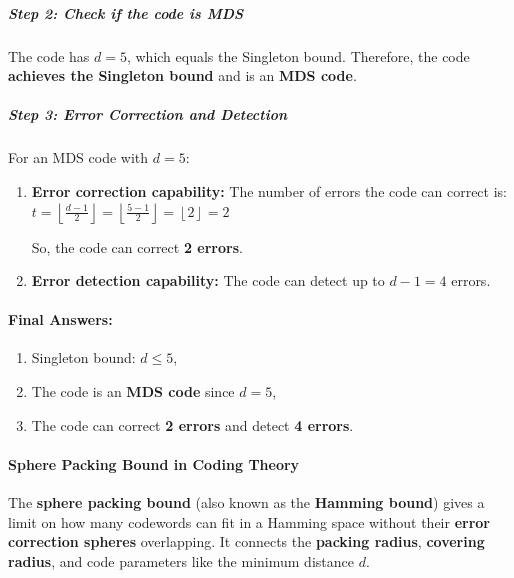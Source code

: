 \documentclass[11pt]{article}
\providecommand{\tightlist}{%
      \setlength{\itemsep}{0pt}\setlength{\parskip}{0pt}}
\begin{document}
\subparagraph{\texorpdfstring{\textbf{Step 2: Check if the code is
MDS}}{Step 2: Check if the code is MDS}}\label{step-2-check-if-the-code-is-mds}

The code has \(d = 5\), which equals the Singleton bound. Therefore, the
code \textbf{achieves the Singleton bound} and is an \textbf{MDS code}.

\subparagraph{\texorpdfstring{\textbf{Step 3: Error Correction and
Detection}}{Step 3: Error Correction and Detection}}\label{step-3-error-correction-and-detection}

For an MDS code with \(d = 5\):

\begin{enumerate}
\def\labelenumi{\arabic{enumi}.}
\item
  \textbf{Error correction capability:} The number of errors the code
  can correct is:
  \(t = \left\lfloor \frac{d - 1}{2} \right\rfloor = \left\lfloor \frac{5 - 1}{2} \right\rfloor = \left\lfloor 2 \right\rfloor = 2\)

  So, the code can correct \textbf{2 errors}.
\item
  \textbf{Error detection capability:} The code can detect up to
  \textbf{\(d - 1 = 4\)} errors.
\end{enumerate}

\paragraph{\texorpdfstring{\textbf{Final
Answers:}}{Final Answers:}}\label{final-answers}

\begin{enumerate}
\def\labelenumi{\arabic{enumi}.}
\tightlist
\item
  Singleton bound: \(d \leq 5\),
\item
  The code is an \textbf{MDS code} since \(d = 5\),
\item
  The code can correct \textbf{2 errors} and detect \textbf{4 errors}.
\end{enumerate}

    \paragraph{\texorpdfstring{\textbf{Sphere Packing Bound in Coding
Theory}}{Sphere Packing Bound in Coding Theory}}\label{sphere-packing-bound-in-coding-theory}

The \textbf{sphere packing bound} (also known as the \textbf{Hamming
bound}) gives a limit on how many codewords can fit in a Hamming space
without their \textbf{error correction spheres} overlapping. It connects
the \textbf{packing radius}, \textbf{covering radius}, and code
parameters like the minimum distance \(d\).
\end{document}
